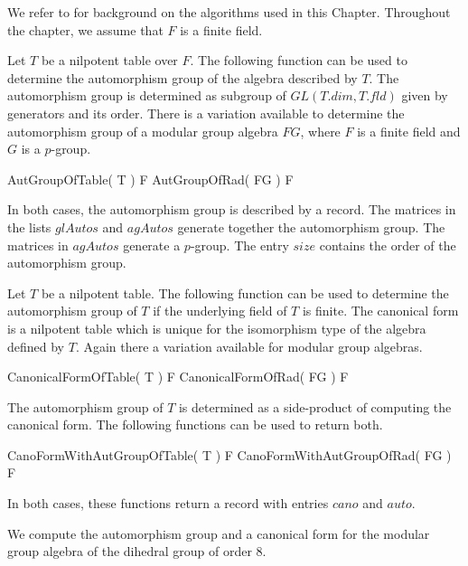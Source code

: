 
We refer to \cite{Eic07} for background on the algorithms used in this 
Chapter. Throughout the chapter, we assume that $F$ is a finite field.


Let $T$ be a nilpotent table over $F$. The following function can be used 
to determine the automorphism group of the algebra described by $T$. The
automorphism group is determined as subgroup of $GL(T.dim, T.fld)$ given 
by generators and its order. There is a variation available to determine
the automorphism group of a modular group algebra $FG$, where $F$ is a finite
field and $G$ is a $p$-group.

\> AutGroupOfTable( T ) F 
\> AutGroupOfRad( FG ) F 

In both cases, the automorphism group is described by a record. The
matrices in the lists $glAutos$ and $agAutos$ generate together the 
automorphism group. The matrices in $agAutos$ generate a $p$-group.
The entry $size$ contains the order of the automorphism group.


Let $T$ be a nilpotent table. The following function can be used to determine
the automorphism group of $T$ if the underlying field of $T$ is finite. The
canonical form is a nilpotent table which is unique for the isomorphism type
of the algebra defined by $T$. Again there a variation available for modular
group algebras. 

\> CanonicalFormOfTable( T ) F 
\> CanonicalFormOfRad( FG ) F 

The automorphism group of $T$ is determined as a side-product of computing
the canonical form. The following functions can be used to return both.

\> CanoFormWithAutGroupOfTable( T ) F
\> CanoFormWithAutGroupOfRad( FG ) F

In both cases, these functions return a record with entries $cano$ and
$auto$.


We compute the automorphism group and a canonical form for the 
modular group algebra of the dihedral group of order 8.

